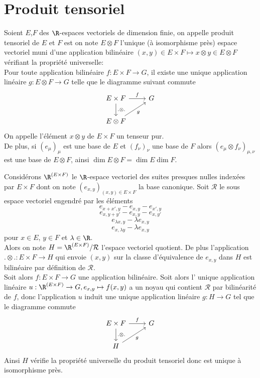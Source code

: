 
\section{Produit tensoriel}

\begin{defi}
Soient $E$,$F$ des $\R$-espaces vectoriels de dimension finie, on appelle produit tensoriel de $E$ et $F$ est on note $E\otimes F$ l'unique (à isomorphisme près) espace vectoriel muni d'une application bilinéaire $(x,y) \in E\times F \mapsto x\otimes y \in E\otimes F$ vérifiant la propriété universelle: \\
Pour toute application bilinéaire $f: E\times F \to G$, il existe une unique application linéaire $g: E\otimes F \to G$ telle que le diagramme suivant commute
$$\begin{tikzcd}
E \times F \arrow[r, "f"]  \arrow[d, ".\otimes ."] & G \\
E\otimes F \arrow[ru, "g"']& 
\end{tikzcd}$$
On appelle l'élément $x\otimes y$ de $E\times F$ un tenseur pur. \\

De plus, si $(e_\mu)_\mu$ est une base de $E$ et $(f_\nu)_\nu$ une base de $F$ alors $(e_\mu\otimes f_\nu)_{\mu,\nu}$ est une base de $E\otimes F$, ainsi $\dim E\otimes F = \dim E \dim F$.
\end{defi}
\begin{preu}
Considérons $\R^{(E\times F)}$ le $\R$-espace vectoriel des suites presques nulles indexées par $E\times F$ dont on note $(e_{x,y})_{(x,y)\in E\times F}$ la base canonique. Soit $\mathcal{R}$ le sous espace vectoriel engendré par les éléments 
$$e_{x+x', y}-e_{x,y}-e_{x',y}$$
$$e_{x, y+y'}-e_{x,y}-e_{x, y'}$$
$$e_{\lambda x, y}-\lambda e_{x, y}$$
$$e_{x, \lambda y}-\lambda e_{x, y}$$
pour $x\in E$, $y\in F$ et $\lambda \in \R$. \\

Alors on note $H = \R^{(E\times F)}/\mathcal{R}$ l'espace vectoriel quotient. De plus l'application $.\otimes . : E\times F \to H$ qui envoie $(x,y)$ sur la classe d'équivalence de $e_{x,y}$ dans $H$ est bilinéaire par définition de $\mathcal{R}$. \\

Soit alors $f:E\times F \to G$ une application bilinéaire. Soit alors l' unique application linéaire $u: \R^{(E\times F)} \to G, e_{x,y} \mapsto f(x,y)$ a un noyau qui contient $\mathcal{R}$ par bilinéarité de $f$, donc l'application $u$ induit une unique application linéaire $g : H\to G$ tel que le diagramme commute 
$$\begin{tikzcd}
E \times F \arrow[r, "f"]  \arrow[d, ".\otimes ."] & G \\
H \arrow[ru, "g"']& 
\end{tikzcd}$$
Ainsi $H$ vérifie la propriété universelle du produit tensoriel donc est unique à isomorphisme près.
\end{preu}

